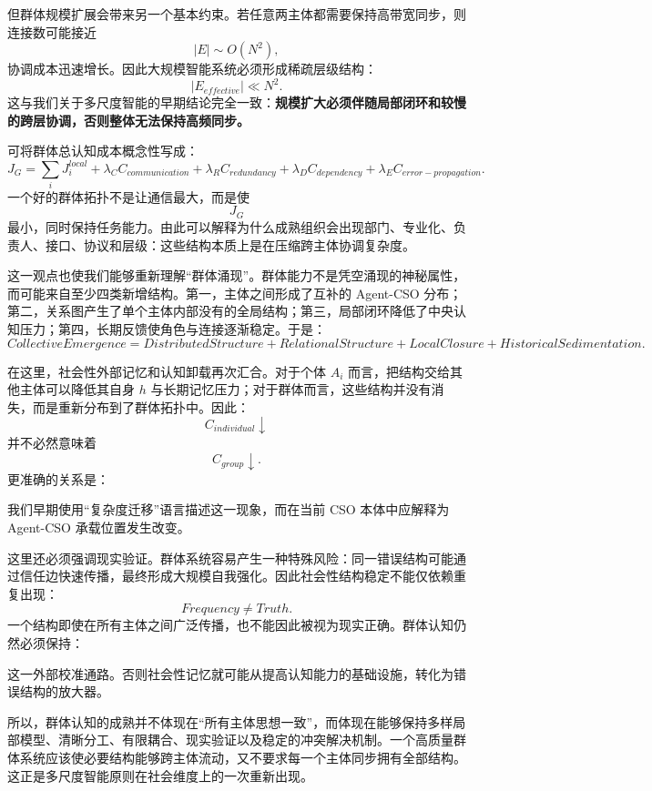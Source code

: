 但群体规模扩展会带来另一个基本约束。若任意两主体都需要保持高带宽同步，则连接数可能接近
\[
|E|\sim O(N^2),
\]
协调成本迅速增长。因此大规模智能系统必须形成稀疏层级结构：
\[
|E_{effective}|\ll N^2.
\]
这与我们关于多尺度智能的早期结论完全一致：\textbf{规模扩大必须伴随局部闭环和较慢的跨层协调，否则整体无法保持高频同步。}

可将群体总认知成本概念性写成：
\[
J_G
=
\sum_i J_i^{local}
+
\lambda_C C_{communication}
+
\lambda_R C_{redundancy}
+
\lambda_D C_{dependency}
+
\lambda_E C_{error-propagation}.
\]
一个好的群体拓扑不是让通信最大，而是使
\[
J_G
\]
最小，同时保持任务能力。由此可以解释为什么成熟组织会出现部门、专业化、负责人、接口、协议和层级：这些结构本质上是在压缩跨主体协调复杂度。

这一观点也使我们能够重新理解``群体涌现''。群体能力不是凭空涌现的神秘属性，而可能来自至少四类新增结构。第一，主体之间形成了互补的 Agent-CSO 分布；第二，关系图产生了单个主体内部没有的全局结构；第三，局部闭环降低了中央认知压力；第四，长期反馈使角色与连接逐渐稳定。于是：
\[
\boxed{
CollectiveEmergence
=
DistributedStructure
+
RelationalStructure
+
LocalClosure
+
HistoricalSedimentation.
}
\]

在这里，社会性外部记忆和认知卸载再次汇合。对于个体 $A_i$ 而言，把结构交给其他主体可以降低其自身 $h$ 与长期记忆压力；对于群体而言，这些结构并没有消失，而是重新分布到了群体拓扑中。因此：
\[
C_{individual}\downarrow
\]
并不必然意味着
\[
C_{group}\downarrow.
\]
更准确的关系是：
\begin{statementbox}
\centering
{}
\end{statementbox}
我们早期使用``复杂度迁移''语言描述这一现象，而在当前 CSO 本体中应解释为 Agent-CSO 承载位置发生改变。

这里还必须强调现实验证。群体系统容易产生一种特殊风险：同一错误结构可能通过信任边快速传播，最终形成大规模自我强化。因此社会性结构稳定不能仅依赖重复出现：
\[
Frequency\neq Truth.
\]
一个结构即使在所有主体之间广泛传播，也不能因此被视为现实正确。群体认知仍然必须保持：
\begin{statementbox}
\centering
{}
\end{statementbox}
这一外部校准通路。否则社会性记忆就可能从提高认知能力的基础设施，转化为错误结构的放大器。

所以，群体认知的成熟并不体现在``所有主体思想一致''，而体现在能够保持多样局部模型、清晰分工、有限耦合、现实验证以及稳定的冲突解决机制。一个高质量群体系统应该使必要结构能够跨主体流动，又不要求每一个主体同步拥有全部结构。这正是多尺度智能原则在社会维度上的一次重新出现。

